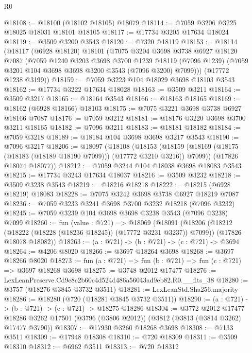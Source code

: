 \begin{lexlean}{R0}
\begin{coremodule}
@18108 := @18100 (@18102 @18105) @18079
@18114 := @7059 @3206 @3225 @18025 @18031 @18101 @18105
@18117 := @17734 @3205 @17634 @18024
@18119 := @3509 @3200 @3543
@18120 := @7320 @18119
@18153 := @18114
    (@18117
      (@6928 @18120)
      @18101
      (@7075
        @3204
        @3698
        @3738
        @6927
        @18120
        @7087
        (@7059
          @1240
          @3203
          @3698
          @3700
          @1239
          @18119
          (@7096 @1239)
          (@7059 @3201 @104 @3698 @3698 @3200 @3543 (@7096 @3200) @7099)))
      (@17772 @1238 @3199))
@18159 := @7059 @3223 @104 @18029 @3698 @18103 @3543
@18162 := @17734 @3222 @17634 @18028
@18163 := @3509 @3211
@18164 := @3509 @3217
@18165 := @18164 @3543
@18166 := @18163 @18165
@18169 := @18162 (@6928 @18166) @18103
@18175 := @7075 @3221 @3698 @3738 @6927 @18166 @7087
@18176 := @7059 @3212
@18181 := @18176 @3220 @3698 @3700 @3211 @18165
@18182 := @7096 @3211
@18183 := @18181 @18182
@18184 := @7059 @3218
@18189 := @18184 @104 @3698 @3698 @3217 @3543
@18190 := @7096 @3217
@18206 := @18097
    (@18108
      (@18153 (@18159 (@18169 (@18175 (@18183 (@18189 @18190 @7099))) (@17772 @3210 @3216)) @7099))
      (@17826 @18074 @18077))
@18212 := @7059 @3244 @104 @18038 @3698 @18083 @3543
@18215 := @17734 @3243 @17634 @18037
@18216 := @3509 @3232
@18218 := @3509 @3238 @3543
@18219 := @18216 @18218
@18222 := @18215 (@6928 @18219) @18083
@18228 := @7075 @3242 @3698 @3738 @6927 @18219 @7087
@18236 := @7059 @3233 @3241 @3698 @3700 @3232 @18218 (@7096 @3232)
@18245 := @7059 @3239 @104 @3698 @3698 @3238 @3543 (@7096 @3238) @7099
@18260 := fun (value : @721) =>
  @18069
    (@18091
      (@18206 (@18212 (@18222 (@18228 (@18236 @18245)) (@17772 @3231 @3237)) @7099))
      (@17826 @18078 @18082))
@18263 := (a : @721) -> (b : @721) -> (c : @721) -> @3694
@18264 := @4206 @8020
@18266 := @3697 @18264 @3698
@18268 := @3697 @18266 @8020
@18273 := fun (a : @721) => fun (b : @721) => fun (c : @721) => @3697 @18268 @3698
@18275 := @3748 @2012 @17477
@18276 := LexLeanPreserve.Cd9c8c2b60c4d524d486a56043ad9eb82.R0.__fits_38
@18280 := @3757 (@18276 @3845 @3732 @3511)
@18281 := LexLeanStd.Sha256.majority
@18286 := @18280 (@720 (@18281 @3845 @3732 @3511))
@18290 := (a : @721) -> (b : @721) -> (c : @721) -> @18275 @18286
@18304 := @3772
    @2012
    @17477
    @18286
    @3262
    @17501
    (@3796 (@3806 @2012))
    (@3812 (@3813 (@3814 @3262) @17477 @3790))
@18307 := @17930 @3260 @18268 @3698
@18308 := @7133 @3511
@18309 := @17948 @18308
@18310 := @720 @18309
@18311 := @3509 @18310
@18312 := @6962 @3511
@18313 := @720 @18312

\end{coremodule}
\end{lexlean}
